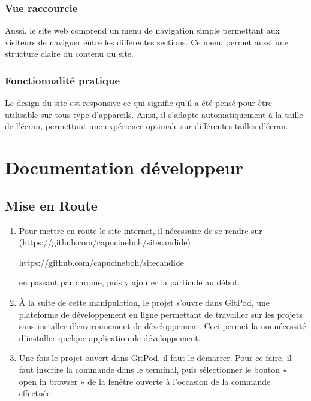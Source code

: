 \documentclass[a4,10pt,french]{sphinxmanual}
\begin{document}
\subsection{Vue raccourcie}
\label{\detokenize{chapitre-01:vue-raccourcie}}
\sphinxAtStartPar
Aussi, le site web comprend un menu de navigation simple permettant aux visiteurs de naviguer entre les différentes sections. Ce menu permet aussi une structure claire du contenu du site.


\subsection{Fonctionnalité pratique}
\label{\detokenize{chapitre-01:fonctionnalite-pratique}}
\sphinxAtStartPar
Le design du site est responsive ce qui signifie qu’il a été pensé pour être utilisable sur tous type d’appareils. Ainsi, il s’adapte automatiquement à la taille de l’écran, permettant une expérience optimale sur différentes tailles d’écran.

\sphinxAtStartPar



\chapter{Documentation développeur}
\label{\detokenize{chapitre-02:documentation-developpeur}}\label{\detokenize{chapitre-02::doc}}

\section{Mise en Route}
\label{\detokenize{chapitre-02:mise-en-route}}\begin{enumerate}
%
\item {} 
\sphinxAtStartPar
Pour mettre en route le site internet, il nécessaire de se rendre sur  (https://github.com/capucineboh/site\sphinxhyphen{}candide)\sphinxstepexplicit %
\begin{footnote}[1]\label{\thesphinxscope.1}%
\sphinxAtStartFootnote
https://github.com/capucineboh/site\sphinxhyphen{}candide
%
\end{footnote} en passant par chrome, puis y ajouter la particule  au début.

\item {} 
\sphinxAtStartPar
À la suite de cette manipulation, le projet s’ouvre dans GitPod, une plateforme de développement en ligne permettant de travailler sur les projets sans installer d’environnement de développement. Ceci permet la non\sphinxhyphen{}nécessité d’installer quelque application de développement.

\item {} 
\sphinxAtStartPar
Une fois le projet ouvert dans GitPod, il faut le démarrer. Pour ce faire, il faut inscrire la commande  dans le terminal, puis sélectionner le bouton « open in browser » de la fenêtre ouverte à l’occasion de la commande effectuée.

\end{enumerate}
\end{document}

